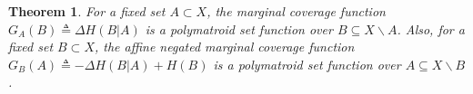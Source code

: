 \documentclass[letterpaper, 10 pt, conference]{ieeeconf}
\newtheorem{theorem}{Theorem}
\begin{document}
\begin{theorem}\label{Th:SubmodularityOfMarginalCoverage}
For a fixed set $A \subset X$, the marginal coverage function $G_A(B) \triangleq \Delta H (B \vert A)$ is a polymatroid set function over $B \subseteq X \backslash A$. Also, for a fixed set $B \subset X$, the affine negated marginal coverage function $G_B(A) \triangleq -\Delta H (B \vert A)+H(B)$ is a polymatroid set function over $A \subseteq X \backslash B$.
\end{theorem} 

\end{document}
